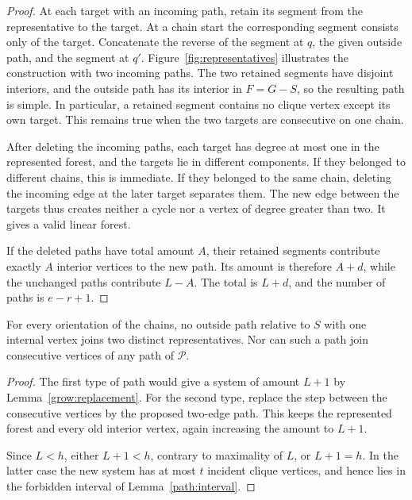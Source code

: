 \begin{proof}
At each target with an incoming path, retain its segment from the
representative to the target.  At a chain start the corresponding
segment consists only of the target.  Concatenate the reverse of the
segment at $q$, the given outside path, and the segment at $q'$.
Figure~\ref{fig:representatives} illustrates the construction with two
incoming paths.
The two retained segments have disjoint interiors, and the outside
path has its interior in $F=G-S$, so the resulting path is simple.
In particular, a retained segment contains no clique vertex except
its own target.  This remains true when the two targets are
consecutive on one chain.

After deleting the incoming paths, each target has degree at most
one in the represented forest, and the targets lie in different
components.  If they belonged to different chains, this is immediate.
If they belonged to the same chain, deleting the incoming edge at
the later target separates them.  The new edge between the targets
thus creates neither a cycle nor a vertex of degree greater than
two.  It gives a valid linear forest.

If the deleted paths have total amount $A$, their retained segments
contribute exactly $A$ interior vertices to the new path.  Its amount
is therefore $A+d$, while the unchanged paths contribute $L-A$.
The total is $L+d$, and the number of paths is $e-r+1$.
\end{proof}

\begin{lemma}\label{grow:one}
For every orientation of the chains, no outside path relative to $S$
with one internal vertex joins two distinct representatives.
Nor can such a path join consecutive vertices of any path of
$\mathcal P$.
\end{lemma}

\begin{proof}
The first type of path would give a system of amount $L+1$ by
Lemma~\ref{grow:replacement}.  For the second type, replace the step
between the consecutive vertices by the proposed two-edge path.
This keeps the represented forest and every old interior vertex,
again increasing the amount to $L+1$.

Since $L<h$, either $L+1<h$, contrary to maximality of $L$, or
$L+1=h$.  In the latter case the new system has at most $t$ incident
clique vertices, and hence lies in the forbidden interval of
Lemma~\ref{path:interval}.
\end{proof}

